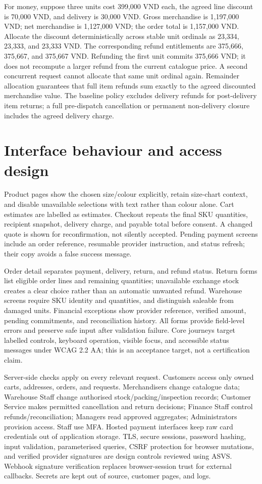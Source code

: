 For money, suppose three units cost 399,000 VND each, the agreed line discount is 70,000 VND, and delivery is 30,000 VND. Gross merchandise is 1,197,000 VND; net merchandise is 1,127,000 VND; the order total is 1,157,000 VND. Allocate the discount deterministically across stable unit ordinals as 23,334, 23,333, and 23,333 VND. The corresponding refund entitlements are 375,666, 375,667, and 375,667 VND. Refunding the first unit commits 375,666 VND; it does not recompute a larger refund from the current catalogue price. A second concurrent request cannot allocate that same unit ordinal again. Remainder allocation guarantees that full item refunds sum exactly to the agreed discounted merchandise value. The baseline policy excludes delivery refunds for post-delivery item returns; a full pre-dispatch cancellation or permanent non-delivery closure includes the agreed delivery charge.

\section{Interface behaviour and access design}
Product pages show the chosen size/colour explicitly, retain size-chart context, and disable unavailable selections with text rather than colour alone. Cart estimates are labelled as estimates. Checkout repeats the final SKU quantities, recipient snapshot, delivery charge, and payable total before consent. A changed quote is shown for reconfirmation, not silently accepted. Pending payment screens include an order reference, resumable provider instruction, and status refresh; their copy avoids a false success message.

Order detail separates payment, delivery, return, and refund status. Return forms list eligible order lines and remaining quantities; unavailable exchange stock creates a clear choice rather than an automatic unwanted refund. Warehouse screens require SKU identity and quantities, and distinguish saleable from damaged units. Financial exceptions show provider reference, verified amount, pending commitments, and reconciliation history. All forms provide field-level errors and preserve safe input after validation failure. Core journeys target labelled controls, keyboard operation, visible focus, and accessible status messages under WCAG 2.2 AA\cite{wcag}; this is an acceptance target, not a certification claim.

Server-side checks apply on every relevant request. Customers access only owned carts, addresses, orders, and requests. Merchandisers change catalogue data; Warehouse Staff change authorised stock/packing/inspection records; Customer Service makes permitted cancellation and return decisions; Finance Staff control refunds/reconciliation; Managers read approved aggregates; Administrators provision access. Staff use MFA. Hosted payment interfaces keep raw card credentials out of application storage. TLS, secure sessions, password hashing, input validation, parameterised queries, CSRF protection for browser mutations, and verified provider signatures are design controls reviewed using ASVS\cite{asvs}. Webhook signature verification replaces browser-session trust for external callbacks. Secrets are kept out of source, customer pages, and logs.

